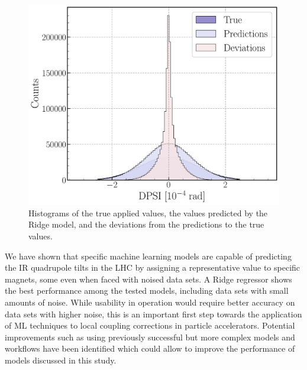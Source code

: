 \begin{figure}[!htb]
  \centering
  \includegraphics*[width=0.9\columnwidth]{Figures/Chapter5/ridge_histograms.pdf}
  \caption{Histograms of the true applied \DPSI values, the values predicted by the Ridge model, and the deviations from the predictions to the true values.}
  \label{fig:ridge_histograms}
\end{figure}

We have shown that specific machine learning models are capable of predicting the IR quadrupole tilts in the LHC by assigning a representative value to specific magnets, some even when faced with noised data sets.
A Ridge regressor shows the best performance among the tested models, including data sets with small amounts of noise.
While usability in operation would require better accuracy on data sets with higher noise, this is an important first step towards the application of ML techniques to local coupling corrections in particle accelerators.
Potential improvements such as using previously successful but more complex models and workflows have been identified which could allow to improve the performance of models discussed in this study.





